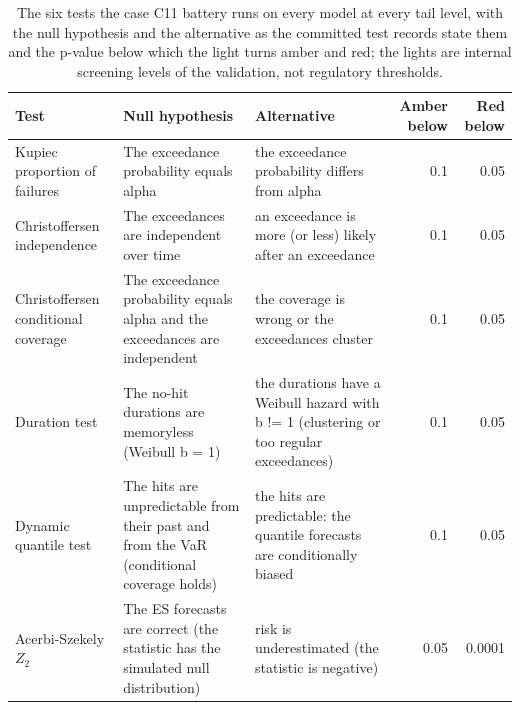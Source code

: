 \begin{table}[htbp]
\centering
\scriptsize
\setlength{\tabcolsep}{2.5pt}
\caption{The six tests the case C11 battery runs on every model at every tail level, with the null hypothesis and the alternative as the committed test records state them and the p-value below which the light turns amber and red; the lights are internal screening levels of the validation, not regulatory thresholds.}
\label{tab:market-tests}
\begin{tabular}{p{2.9cm}p{4.4cm}p{4.4cm}rr}
\toprule
Test & Null hypothesis & Alternative & Amber below & Red below \\
\midrule
\relax Kupiec proportion of failures & The exceedance probability equals alpha & the exceedance probability differs from alpha & 0.1 & 0.05 \\
\relax Christoffersen independence & The exceedances are independent over time & an exceedance is more (or less) likely after an exceedance & 0.1 & 0.05 \\
\relax Christoffersen conditional coverage & The exceedance probability equals alpha and the exceedances are independent & the coverage is wrong or the exceedances cluster & 0.1 & 0.05 \\
\relax Duration test & The no-hit durations are memoryless (Weibull b = 1) & the durations have a Weibull hazard with b != 1 (clustering or too regular exceedances) & 0.1 & 0.05 \\
\relax Dynamic quantile test & The hits are unpredictable from their past and from the VaR (conditional coverage holds) & the hits are predictable: the quantile forecasts are conditionally biased & 0.1 & 0.05 \\
\relax Acerbi-Szekely $Z_2$ & The ES forecasts are correct (the statistic has the simulated null distribution) & risk is underestimated (the statistic is negative) & 0.05 & 0.0001 \\
\bottomrule
\end{tabular}
\end{table}
